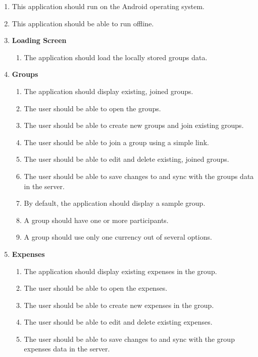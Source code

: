 \documentclass[conference]{IEEEtran}
\begin{document}
\begin{enumerate}
    \item This application should run on the Android operating system.
    \item This application should be able to run offline.
    \item \textbf{Loading Screen}
        \begin{enumerate}
            \item The application should load the locally stored groups data.
        \end{enumerate}
    \item \textbf{Groups}
        \begin{enumerate}
            \item The application should display existing, joined groups.
            \item The user should be able to open the groups.
            \item The user should be able to create new groups and join existing groups.
            \item The user should be able to join a group using a simple link.
            \item The user should be able to edit and delete existing, joined groups.
            \item The user should be able to save changes to and sync with the groups data in the server.
            \item By default, the application should display a sample group.
            \item A group should have one or more participants.
            \item A group should use only one currency out of several options.
        \end{enumerate}
    \item \textbf{Expenses}
        \begin{enumerate}
            \item The application should display existing expenses in the group.
            \item The user should be able to open the expenses.
            \item The user should be able to create new expenses in the group.
            \item The user should be able to edit and delete existing expenses.
            \item The user should be able to save changes to and sync with the group expenses data in the server.

\end{enumerate}
\end{enumerate}
\end{document}
